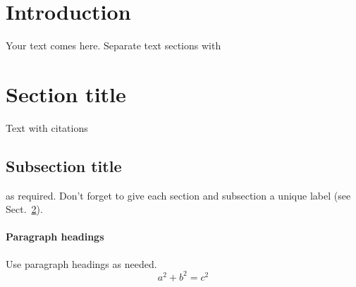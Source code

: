\date{Received: date / Accepted: date}


\maketitle

\begin{abstract}
\end{abstract}

\section{Introduction}
\label{intro}
Your text comes here. Separate text sections with
\section{Section title}
\label{sec:1}
Text with citations %
\subsection{Subsection title}
\label{sec:2}
as required. Don't forget to give each section
and subsection a unique label (see Sect.~\ref{sec:1}).
\paragraph{Paragraph headings} Use paragraph headings as needed.
\begin{equation}
a^2+b^2=c^2
\end{equation}

